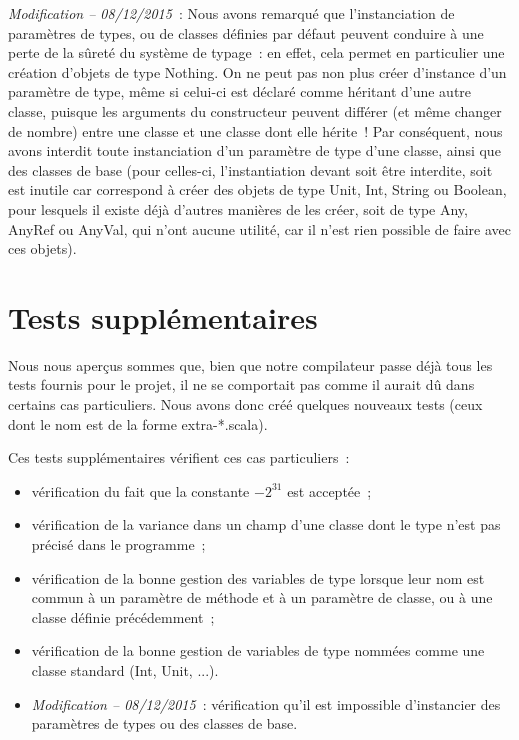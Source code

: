 \documentclass[a4paper,10pt]{article}
\newcommand{\code}[1]{{\fontfamily{pcr}\selectfont #1}}
\begin{document}
\textit{Modification -- 08/12/2015}~:
Nous avons remarqué que l'instanciation de paramètres de types, ou de
classes définies par défaut peuvent conduire à une perte de la sûreté
du système de typage~: en effet, cela permet en particulier une
création d'objets de type \code{Nothing}. On ne peut pas non plus
créer d'instance d'un paramètre de type, même si celui-ci est déclaré
comme héritant d'une autre classe, puisque les arguments du
constructeur peuvent différer (et même changer de nombre) entre une
classe et une classe dont elle hérite~! Par conséquent, nous avons
interdit toute instanciation d'un paramètre de type d'une classe,
ainsi que des classes de base (pour celles-ci, l'instantiation devant
soit être interdite, soit est inutile car correspond à créer des
objets de type \code{Unit}, \code{Int}, \code{String} ou
\code{Boolean}, pour lesquels il existe déjà d'autres manières de les
créer, soit de type \code{Any}, \code{AnyRef} ou \code{AnyVal}, qui
n'ont aucune utilité, car il n'est rien possible de faire avec ces
objets).


\section{Tests supplémentaires}

Nous nous aperçus sommes que, bien que notre compilateur passe déjà
tous les tests fournis pour le projet, il ne se comportait pas comme
il aurait dû dans certains cas particuliers. Nous avons donc créé
quelques nouveaux tests (ceux dont le nom est de la forme
\code{extra-*.scala}).

Ces tests supplémentaires vérifient ces cas particuliers~:
\begin{itemize}
\item{vérification du fait que la constante $-2^{31}$ est acceptée~;}
\item{vérification de la variance dans un champ d'une classe dont le
    type n'est pas précisé dans le programme~;}
\item{vérification de la bonne gestion des variables de type lorsque
    leur nom est commun à un paramètre de méthode et à un paramètre de
  classe, ou à une classe définie précédemment~;}
\item{vérification de la bonne gestion de variables de type nommées
    comme une classe standard (\code{Int}, \code{Unit}, ...).}
\item{\textit{Modification -- 08/12/2015}~: vérification qu'il est
    impossible d'instancier des paramètres de types ou des classes de
    base.}
\end{itemize}
\end{document}
